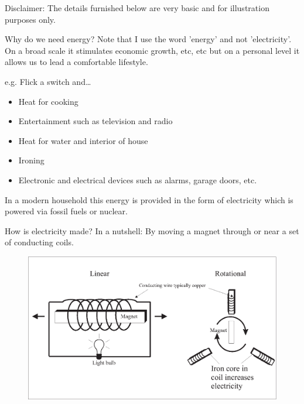 
Disclaimer: The details furnished below are very basic and for
illustration purposes only.

Why do we need energy? Note that I use the word 'energy' and not
'electricity'. On a broad scale it stimulates economic growth, etc,
etc but on a personal level it allows us to lead a comfortable
lifestyle.

e.g. Flick a switch and… 
\begin{itemize}
\item Heat for cooking 
\item Entertainment such as television and radio 
\item Heat for water and interior of house 
\item Ironing
\item Electronic and electrical devices such as alarms, garage doors, etc.
\end{itemize}

In a modern household this energy is provided in the form of electricity which is powered via fossil fuels or nuclear.

How is electricity made? In a nutshell: By moving a magnet through or near a set of conducting coils.

\begin{figure}[H]
\centering
\includegraphics[scale=0.4]{../../epsimages/1ElectricityGeneration.eps}
\end{figure}

